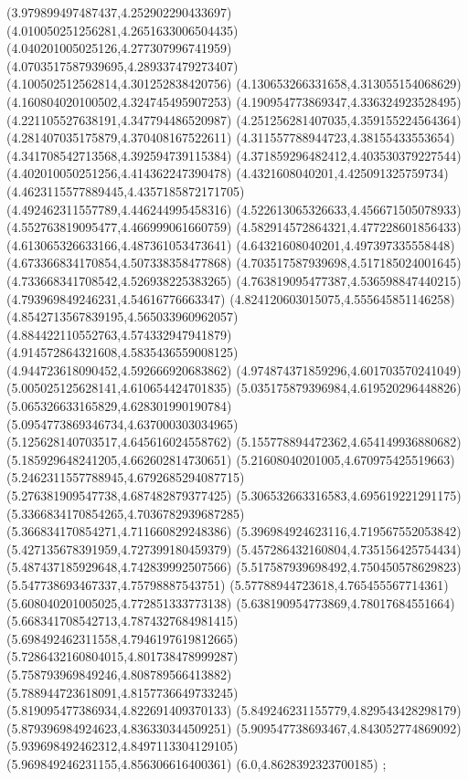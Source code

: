 {(3.979899497487437,4.252902290433697)
(4.010050251256281,4.2651633006504435)
(4.040201005025126,4.277307996741959)
(4.0703517587939695,4.289337479273407)
(4.100502512562814,4.301252838420756)
(4.130653266331658,4.313055154068629)
(4.160804020100502,4.324745495907253)
(4.190954773869347,4.336324923528495)
(4.221105527638191,4.347794486520987)
(4.251256281407035,4.359155224564364)
(4.281407035175879,4.370408167522611)
(4.311557788944723,4.38155433553654)
(4.341708542713568,4.392594739115384)
(4.371859296482412,4.403530379227544)
(4.402010050251256,4.414362247390478)
(4.4321608040201,4.425091325759734)
(4.4623115577889445,4.4357185872171705)
(4.492462311557789,4.446244995458316)
(4.522613065326633,4.456671505078933)
(4.552763819095477,4.466999061660759)
(4.582914572864321,4.477228601856433)
(4.613065326633166,4.487361053473641)
(4.64321608040201,4.497397335558448)
(4.673366834170854,4.507338358477868)
(4.703517587939698,4.517185024001645)
(4.733668341708542,4.526938225383265)
(4.763819095477387,4.536598847440215)
(4.793969849246231,4.54616776663347)
(4.824120603015075,4.555645851146258)
(4.8542713567839195,4.565033960962057)
(4.884422110552763,4.574332947941879)
(4.914572864321608,4.5835436559008125)
(4.944723618090452,4.592666920683862)
(4.974874371859296,4.601703570241049)
(5.005025125628141,4.610654424701835)
(5.035175879396984,4.619520296448826)
(5.065326633165829,4.628301990190784)
(5.0954773869346734,4.637000303034965)
(5.125628140703517,4.645616024558762)
(5.155778894472362,4.654149936880682)
(5.185929648241205,4.662602814730651)
(5.21608040201005,4.670975425519663)
(5.2462311557788945,4.6792685294087715)
(5.276381909547738,4.687482879377425)
(5.306532663316583,4.695619221291175)
(5.3366834170854265,4.7036782939687285)
(5.366834170854271,4.711660829248386)
(5.396984924623116,4.719567552053842)
(5.427135678391959,4.727399180459379)
(5.457286432160804,4.735156425754434)
(5.487437185929648,4.742839992507566)
(5.517587939698492,4.750450578629823)
(5.547738693467337,4.75798887543751)
(5.57788944723618,4.765455567714361)
(5.608040201005025,4.772851333773138)
(5.638190954773869,4.78017684551664)
(5.668341708542713,4.7874327684981415)
(5.698492462311558,4.7946197619812665)
(5.7286432160804015,4.801738478999287)
(5.758793969849246,4.808789566413882)
(5.788944723618091,4.8157736649733245)
(5.819095477386934,4.822691409370133)
(5.849246231155779,4.829543428298179)
(5.879396984924623,4.836330344509251)
(5.909547738693467,4.843052774869092)
(5.939698492462312,4.8497113304129105)
(5.969849246231155,4.856306616400361)
(6.0,4.8628392323700185)
};
